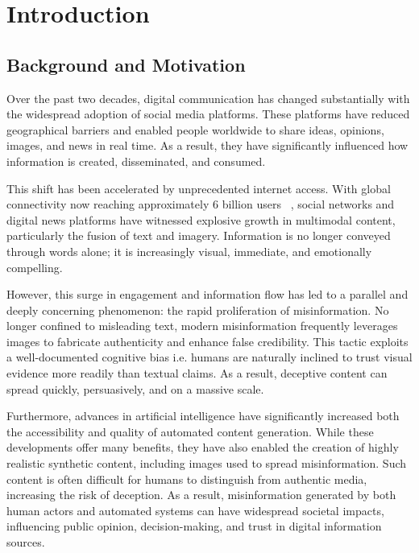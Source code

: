 \chapter{Introduction}
\label{ch:intro}

\section{Background and Motivation}
\label{sec:intro:background}
\noindent
Over the past two decades, digital communication has changed substantially with the widespread adoption of social media platforms. These platforms have reduced geographical barriers and enabled people worldwide to share ideas, opinions, images, and news in real time. As a result, they have significantly influenced how information is created, disseminated, and consumed.

This shift has been accelerated by unprecedented internet access. With global connectivity now reaching approximately 6 billion users ~\cite{BibEntry2026May1}, social networks and digital news platforms have witnessed explosive growth in multimodal content, particularly the fusion of text and imagery. Information is no longer conveyed through words alone; it is increasingly visual, immediate, and emotionally compelling.

However, this surge in engagement and information flow has led to a parallel and deeply concerning phenomenon: the rapid proliferation of misinformation. No longer confined to misleading text, modern misinformation frequently leverages images to fabricate authenticity and enhance false credibility. This tactic exploits a well-documented cognitive bias i.e. humans are naturally inclined to trust visual evidence more readily than textual claims. As a result, deceptive content can spread quickly, persuasively, and on a massive scale.

Furthermore, advances in artificial intelligence have significantly increased both the accessibility and quality of automated content generation. While these developments offer many benefits, they have also enabled the creation of highly realistic synthetic content, including images used to spread misinformation. Such content is often difficult for humans to distinguish from authentic media, increasing the risk of deception. As a result, misinformation generated by both human actors and automated systems can have widespread societal impacts, influencing public opinion, decision-making, and trust in digital information sources. 

